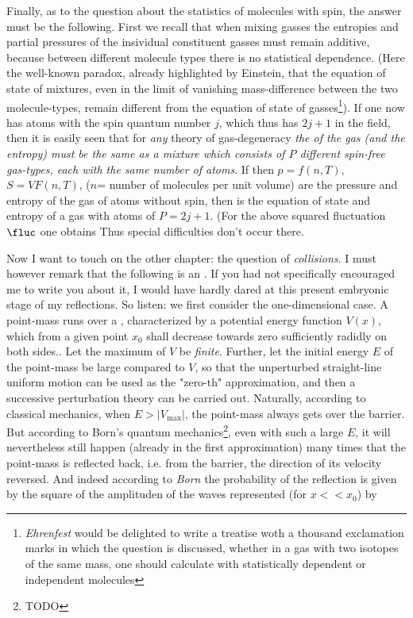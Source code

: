 Finally, as to the question about the statistics of molecules with spin, the answer must be the following. First we recall that when mixing gasses the entropies and partial pressures of the insividual constituent gasses must remain additive, because between different molecule types there is no statistical dependence. (Here the well-known paradox, already highlighted by Einstein, that the equation of state of mixtures, even in the limit of vanishing mass-difference between the two molecule-types, remain different from the equation of state of  gasses\footnote{\textit{Ehrenfest} would be delighted to write a treatise woth a thousand exclamation marks in which the question is discussed, whether in a gas with two isotopes of the same mass, one should calculate with statistically dependent or independent molecules}). If one now has atoms with the spin quantum number $j$, which thus has $2j+1$  in the field, then it is easily seen that for \textit{any} theory of gas-degeneracy \textit{the  of the gas (and the entropy) must be the same as a mixture which consists of $P$ different spin-free gas-types, each with the same number of atoms}. If then $p=f(n,T)$,$S=VF(n,T)$, ($n$= number of molecules per unit volume) are the pressure and entropy of the gas of atoms without spin, then
is the equation of state and entropy of a gas with atoms of  $P=2j+1$. (For the above squared fluctuation $\fluc$ one obtains
Thus special difficulties don't occur there.

Now I want to touch on the other chapter: the question of \textit{collisions}. I must however remark that the following is an . If you had not specifically encouraged me to write you about it, I would have hardly dared at this present embryonic stage of my reflections. So listen: we first consider the one-dimensional case. A point-mass runs over a , characterized by a potential energy function $V(x)$, which from a given point $x_0$ shall decrease towards zero sufficiently radidly on both sides.. Let the maximum of $V$ be \textit{finite}. Further, let the initial energy $E$ of the point-mass be large compared to $V$, so that the unperturbed straight-line uniform motion can be used as the "zero-th" approximation, and then a successive perturbation theory can be carried out. Naturally, according to classical mechanics, when $E>|V_\text{max}|$, the point-mass always gets over the barrier. But according to Born's quantum mechanics\footnote{TODO}, even with such a large $E$, it will nevertheless still happen (already in the first approximation) many times that the point-mass is reflected back, i.e. from the barrier, the direction of its velocity reversed. And indeed according to \textit{Born} the  probability of the reflection is given by the square of the amplituden of the waves represented (for $x<<x_0$) by

